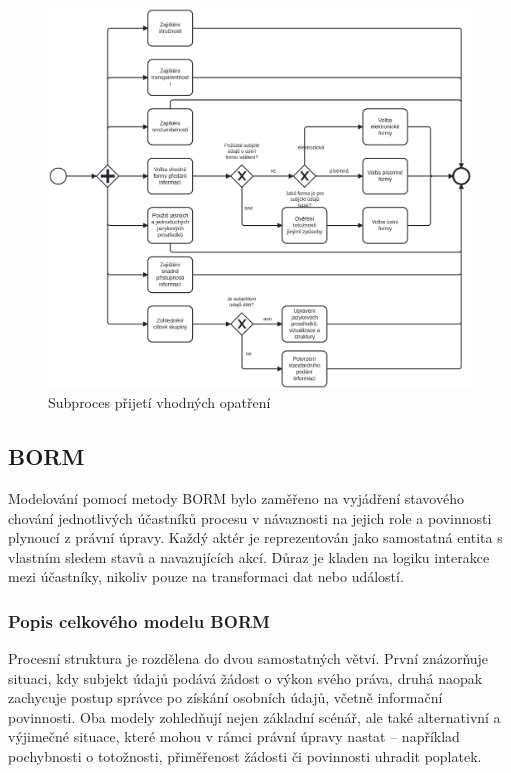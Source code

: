 \begin{itemize}
  \begin{figure}[H]
    \centering
    \includegraphics[width=\textwidth]{images/BPMN_informace_opatreni.png}
    \caption{Subproces přijetí vhodných opatření}
    \label{fig:bpmn_opatreni}
  \end{figure}

\end{itemize}


\subsection{BORM}
\label{sec:borm}
Modelování pomocí metody BORM bylo zaměřeno na vyjádření stavového chování jednotlivých účastníků procesu v návaznosti na jejich role a povinnosti plynoucí z právní úpravy. Každý aktér je reprezentován jako samostatná entita s vlastním sledem stavů a navazujících akcí. Důraz je kladen na logiku interakce mezi účastníky, nikoliv pouze na transformaci dat nebo událostí.


\subsubsection{Popis celkového modelu BORM}
\label{sec:borm-popis-modelu}
Procesní struktura je rozdělena do dvou samostatných větví. První znázorňuje situaci, kdy subjekt údajů podává žádost o výkon svého práva, druhá naopak zachycuje postup správce po získání osobních údajů, včetně informační povinnosti. Oba modely zohledňují nejen základní scénář, ale také alternativní a výjimečné situace, které mohou v rámci právní úpravy nastat – například pochybnosti o totožnosti, přiměřenost žádosti či povinnosti uhradit poplatek.

